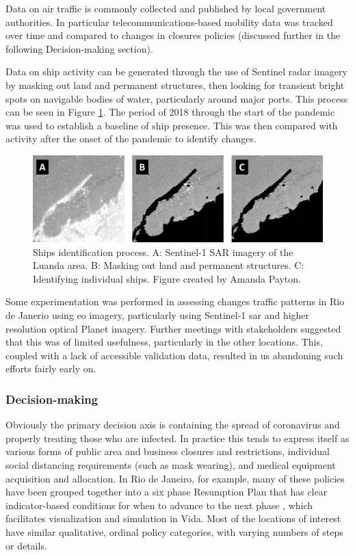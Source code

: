 Data on air traffic is commonly collected and published by local government authorities. In particular telecommunications-based mobility data was tracked over time and compared to changes in closures policies (discussed further in the following Decision-making section).

Data on ship activity can be generated through the use of Sentinel radar imagery by masking out land and permanent structures, then looking for transient bright spots on navigable bodies of water, particularly around major ports. This process can be seen in Figure \ref{fig:ships}. The period of 2018 through the start of the pandemic was used to establish a baseline of ship presence. This was then compared with activity after the onset of the pandemic to identify changes. 

\begin{figure}[!htb]
	\centering
	\includegraphics[scale=0.35]{Figures/chap5/ships.pdf}
	\caption[Ships identification process]{Ships identification process. A: Sentinel-1 SAR imagery of the Luanda area. B: Masking out land and permanent structures. C: Identifying individual ships. Figure created by Amanda Payton.}
	\label{fig:ships}
\end{figure}

Some experimentation was performed in assessing changes traffic patterns in Rio de Janerio using \ac{eo} imagery, particularly using Sentinel-1 \ac{sar} and higher resolution optical Planet imagery. Further meetings with stakeholders suggested that this was of limited usefulness, particularly in the other locations. This, coupled with a lack of accessible validation data, resulted in us abandoning such efforts fairly early on.


\subsubsection{Decision-making} \label{sec:vida-evdt-decision-method}

Obviously the primary decision axis is containing the spread of coronavirus and properly treating those who are infected. In practice this tends to express itself as various forms of public area and business closures and restrictions, individual social distancing requirements (such as mask wearing), and medical equipment acquisition and allocation. In Rio de Janeiro, for example, many of these policies have been grouped together into a six phase Resumption Plan that has clear indicator-based conditions for when to advance to the next phase \cite{iplanrioIndicadoresPlanoRetomada2020}, which facilitates visualization and simulation in Vida. Most of the locations of interest have similar qualitative, ordinal policy categories, with varying numbers of steps or details. 

